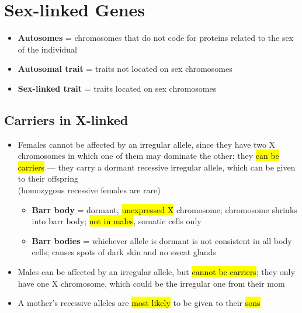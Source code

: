 \documentclass[a4paper,12pt]{article}
\begin{document}
\section{Sex-linked Genes}
\begin{itemize}
    \item{\textbf{Autosomes} = chromosomes that do not code for proteins related to the sex of the individual}
    \item{\textbf{Autosomal trait} = traits not located on sex chromosomes}
    \item{\textbf{Sex-linked trait} = traits located on sex chromosomes}
\end{itemize}

\subsection{Carriers in X-linked}
\begin{itemize}
    \item{
            Females cannot be affected by an irregular allele, since they have two X chromosomes in which one of them may dominate the other; they \hl{can be carriers} --- they carry a dormant recessive irregular allele, which can be given to their offspring \\ (homozygous recessive females are rare)
            \begin{itemize}
                \item{\textbf{Barr body} = dormant, \hl{unexpressed X} chromosome; chromosome shrinks into barr body; \hl{not in males}, somatic cells only}
                \item{\textbf{Barr bodies} = whichever allele is dormant is not consistent in all body cells; causes spots of dark skin and no sweat glands}
            \end{itemize}
        }
    \item{Males can be affected by an irregular allele, but \hl{cannot be carriers}; they only have one X chromosome, which could be the irregular one from their mom}
    \item{A mother's recessive alleles are \hl{most likely} to be given to their \hl{sons}}
\end{itemize}

\pagebreak
\end{document}
